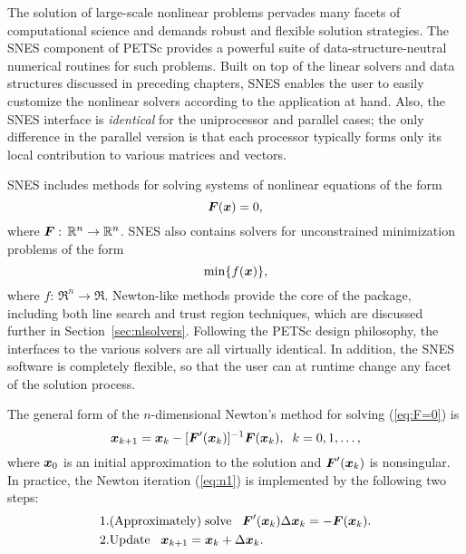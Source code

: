 The solution of large-scale nonlinear problems pervades many facets of
computational science and demands robust and flexible solution
strategies. The SNES component of PETSc provides a powerful suite of
data-structure-neutral numerical routines for such problems.  Built on
top of the linear solvers and data structures discussed in preceding
chapters, SNES enables the user to easily customize the nonlinear
solvers according to the application at hand.  Also, the SNES
interface is {\em identical} for the uniprocessor and parallel cases;
the only difference in the parallel version is that each processor
typically forms only its local contribution to various matrices and
vectors.

SNES includes methods for solving systems of nonlinear equations of the form 
\begin{equation}
\mbox{\boldmath \(F\)}(\mbox{\boldmath \(x\)}) = 0,
\label{eq:F=0}
\end{equation}
where $\mbox{\boldmath \(F\)}: \, \mathbb R^n \rightarrow \mathbb R^n$. SNES also contains solvers for
unconstrained minimization problems of the form
\begin{equation}
{\rm min} \{ f(\mbox{\boldmath \(x\)}) \},
\label{eq:minF}
\end{equation}
where $f: \, \Re^n \rightarrow \Re$.
Newton-like methods provide the core of the package, including
 both line search  
and trust region  techniques, which are discussed
further in Section~\ref{sec:nlsolvers}. Following the
PETSc design philosophy, the interfaces to the various solvers are all
virtually identical. In addition, the SNES software is completely
flexible, so that the user can at runtime change any facet of the
solution process.

The general form of the $n$-dimensional Newton's method for solving
(\ref{eq:F=0}) is
\begin{equation}
     \mbox{\boldmath \(x\)}_{k+1} = \mbox{\boldmath \(x\)}_k - [ \mbox{\boldmath \(F\)}'(\mbox{\boldmath \(x\)}_k)]^{-1} \mbox{\boldmath \(F\)}(\mbox{\boldmath \(x\)}_k), \;\; k=0,1, \ldots, 
\label{eq:n1}
\end{equation}
where $\mbox{\boldmath \(x\)}_0$ is an initial approximation to the solution and   
$\mbox{\boldmath \(F\)}'(\mbox{\boldmath \(x\)}_k)$ is nonsingular.  
In practice, the Newton iteration (\ref{eq:n1}) is implemented by
the following two steps:
\begin{eqnarray}
  1. & {\rm (Approximately) \;solve\;\;\;} \mbox{\boldmath \(F\)}'(\mbox{\boldmath \(x\)}_k) \Delta \mbox{\boldmath \(x\)}_k = -\mbox{\boldmath \(F\)}(\mbox{\boldmath \(x\)}_k).\\
  2. & {\rm Update\;\;\;} \mbox{\boldmath \(x\)}_{k+1} = \mbox{\boldmath \(x\)}_k + \Delta \mbox{\boldmath \(x\)}_k. \hspace{.225in}
\end{eqnarray}

